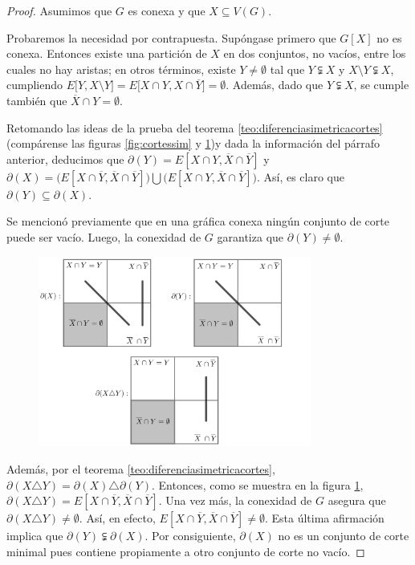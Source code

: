 \begin{proof} Asumimos que $G$ es conexa y que $X \subseteq V(G)$.

Probaremos la necesidad por contrapuesta. Supóngase primero que $G[X]$ no es conexa. Entonces existe una partición de $X$ en dos conjuntos, no vacíos, entre los cuales no hay aristas; en otros términos, existe $Y \neq \emptyset$ tal que $Y \subsetneqq X$ y $X \setminus Y \subsetneqq X$, cumpliendo $E\big[Y, X \setminus Y \big] = E\big[X \cap Y, X \cap \overline{Y} \big] = \emptyset$. Además, dado que $Y \subsetneqq X$, se cumple también que $\overline{X} \cap Y = \emptyset$.

Retomando las ideas de la prueba del teorema \ref{teo:diferenciasimetricacortes} (compárense las figuras \ref{fig:cortessim} y \ref{fig:bond2})y dada la información del párrafo anterior, deducimos que $\partial(Y) = E[X \cap Y, \overline{X} \cap \overline{Y}]$ y $\partial(X) = \big(E[X \cap \overline{Y}, \overline{X} \cap \overline{Y}]\big) \bigcup \big(E[X \cap Y, \overline{X} \cap \overline{Y}]\big)$. Así, es claro que $\partial (Y) \subseteq \partial(X)$.

Se mencionó previamente que en una gráfica conexa ningún conjunto de corte puede ser vacío. Luego, la conexidad de $G$ garantiza que $\partial(Y) \neq \emptyset$.

\begin{figure}[h]
    \centering
    \includegraphics[width=0.8\textwidth]{img/imgchapter2/bond2.jpg}
    \caption{}
    \label{fig:bond2}
\end{figure}
Además, por el teorema \ref{teo:diferenciasimetricacortes}, $\partial(X \triangle Y)= \partial(X) \triangle \partial(Y)$. Entonces, como se muestra en la figura \ref{fig:bond2}, $\partial(X \triangle Y) = E[X \cap \overline{Y}, \overline{X} \cap \overline{Y}]$. Una vez más, la conexidad de $G$ asegura que $\partial(X \triangle Y) \neq \emptyset$. Así, en efecto, $E[X \cap \overline{Y}, \overline{X} \cap \overline{Y}] \neq \emptyset$. Esta última afirmación implica que $\partial(Y) \subsetneqq \partial(X)$. Por consiguiente, $\partial(X)$ no es un conjunto de corte minimal pues contiene propiamente a otro conjunto de corte no vacío.


\end{proof}
